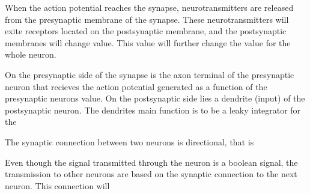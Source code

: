 When the action potential reaches the synapse, neurotransmitters are released from the presynaptic membrane of the synapse. 
These neurotransmitters will exite receptors located on the postsynaptic membrane, and the postsynaptic membranes will change value. This value will further change the value for the whole neuron.

On the presynaptic side of the synapse is the axon terminal of the presynaptic neuron that recieves the action potential generated as a function of the presynaptic neurons value. 
On the postsynaptic side lies a dendrite (input) of the postsynaptic neuron. The dendrites main function is to be a leaky integrator for the 

The synaptic connection between two neurons is directional, that is

Even though the signal transmitted through the neuron is a boolean signal, the transmission to other neurons are based on the synaptic connection to the next neuron. This connection will 


